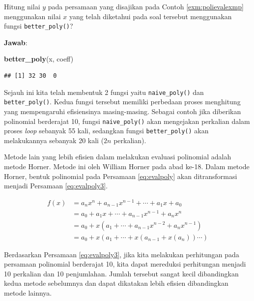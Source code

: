 \documentclass[]{book}
\newenvironment{Shaded}{\begin{snugshade}}{\end{snugshade}}
\newcommand{\KeywordTok}[1]{\textcolor[rgb]{0.13,0.29,0.53}{\textbf{#1}}}
\newcommand{\NormalTok}[1]{#1}
\theoremstyle{definition}
\theoremstyle{definition}
\theoremstyle{definition}
\theoremstyle{remark}
\let\BeginKnitrBlock\begin \let\EndKnitrBlock\end
\begin{document}
\BeginKnitrBlock{example}
\protect\hypertarget{exm:polievalexmp2}{}{\label{exm:polievalexmp2} }Hitung nilai \(y\) pada persamaan yang disajikan pada Contoh \ref{exm:polievalexmp} menggunakan nilai \(x\) yang telah diketahui pada soal tersebut menggunakan fungsi \texttt{better\_poly()}?
\EndKnitrBlock{example}

\textbf{Jawab}:

\begin{Shaded}
\begin{Highlighting}[]
\KeywordTok{better_poly}\NormalTok{(x, coeff)}
\end{Highlighting}
\end{Shaded}

\begin{verbatim}
## [1] 32 30  0
\end{verbatim}

Sejauh ini kita telah membentuk 2 fungsi yaitu \texttt{naive\_poly()} dan \texttt{better\_poly()}. Kedua fungsi tersebut memiliki perbedaan proses menghitung yang mempengaruhi efisiensinya masing-masing. Sebagai contoh jika diberikan polinomial berderajat 10, fungsi \texttt{naive\_poly()} akan mengejakan perkalian dalam proses \emph{loop} sebanyak 55 kali, sedangkan fungsi \texttt{better\_poly()} akan melakukannya sebanyak 20 kali (\(2n\) perkalian).

Metode lain yang lebih efisien dalam melakukan evaluasi polinomial adalah metode Horner. Metode ini oleh William Horner pada abad ke-18. Dalam metode Horner, bentuk polinomial pada Persamaan \eqref{eq:evalpoly} akan ditransformasi menjadi Persamaan \eqref{eq:evalpoly3}.

\begin{equation}
\begin{split}
f\left(x\right)&=a_nx^n+a_{n-1}x^{n-1}+\cdots+a_1x+a_0\\
&= a_0+a_1x+\cdots+a_{n-1}x^{n-1}+a_nx^n\\
&= a_0+x\left(a_1+\cdots+a_{n-1}x^{n-2}+a_nx^{n-1}\right)\\
&= a_0+x\left(a_1+\cdots+x\left(a_{n-1}+x\left(a_n\right)\right)\cdots\right)
\end{split}
  \label{eq:evalpoly3}
\end{equation}

Berdasarkan Persamaan \eqref{eq:evalpoly3}, jika kita melakukan perhitungan pada persamaan polinomial berderajat 10, kita dapat mereduksi perhitungan menjadi 10 perkalian dan 10 penjumlahan. Jumlah tersebut sangat kecil dibandingkan kedua metode sebelumnya dan dapat dikatakan lebih efisien dibandingkan metode lainnya.
\end{document}
